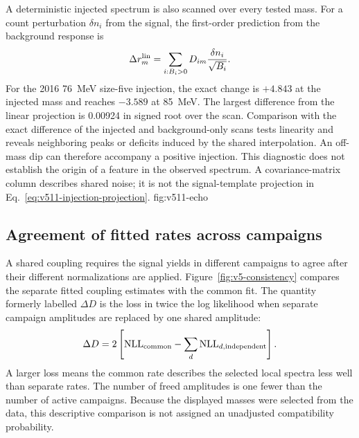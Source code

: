 A deterministic injected spectrum is also scanned over every tested mass.
For a count perturbation $\delta n_i$ from the signal, the first-order
prediction from the background response is
\begin{equation}
 \Delta r_m^{\rm lin}=\sum_{i:B_i>0}D_{im}
                         \frac{\delta n_i}{\sqrt{B_i}}.
 \label{eq:v511-injection-projection}
\end{equation}
For the 2016 76~MeV size-five injection, the exact change is $+4.843$
at the injected mass and reaches $-3.589$ at 85~MeV. The largest difference
from the linear projection is 0.00924 in signed root over the scan.
Comparison with the exact difference of the injected and background-only
scans tests linearity and reveals neighboring peaks or deficits induced by
the shared interpolation. An off-mass dip can therefore accompany a
positive injection. This diagnostic does not establish the origin of a
feature in the observed spectrum. A covariance-matrix column describes
shared noise; it is not the signal-template projection in
Eq.~\ref{eq:v511-injection-projection}.
{fig:v511-echo}
\FloatBarrier



\FloatBarrier\clearpage

\subsection{Agreement of fitted rates across campaigns}
\label{sec:v5-rate-consistency}

A shared coupling requires the signal yields in different campaigns to agree
after their different normalizations are applied. Figure~\ref{fig:v5-consistency}
compares the separate fitted coupling estimates with the common fit. The
quantity formerly labelled $\Delta D$ is the loss in twice the log likelihood
when separate campaign amplitudes are replaced by one shared amplitude:
\begin{equation}
 \Delta D=2\left[\mathrm{NLL}_{\rm common}-
                    \sum_d\mathrm{NLL}_{d,\rm independent}\right].
\end{equation}
A larger loss means the common rate describes the selected local spectra less
well than separate rates. The number of freed amplitudes is one fewer than
the number of active campaigns. Because the displayed masses were selected
from the data, this descriptive comparison is not assigned an unadjusted
compatibility probability.


